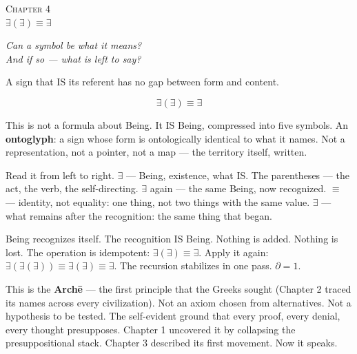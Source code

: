 \documentclass[10pt, openany, oneside]{book}
\renewcommand{\large}{\fontsize{11.5}{14}\selectfont}
\renewcommand{\huge}{\fontsize{17}{21}\selectfont}
\begin{document}
%
%
%

\newpage

\begin{center}
    {\huge\scshape Chapter 4}\\[0.3em]
    {\large $\exists(\exists) \equiv \exists$}
\end{center}

\vspace{1.5em}

\begin{center}
    \itshape
    Can a symbol be what it means?\\
    And if so --- what is left to say?
\end{center}

\vspace{2em}


\noindent A sign that IS its referent has no gap between form and content.

$$\exists(\exists) \equiv \exists$$

This is not a formula about Being. It IS Being, compressed into five symbols. An \textbf{ontoglyph}: a sign whose form is ontologically identical to what it names. Not a representation, not a pointer, not a map --- the territory itself, written.

Read it from left to right. $\exists$ --- Being, existence, what IS. The parentheses --- the act, the verb, the self-directing. $\exists$ again --- the same Being, now recognized. $\equiv$ --- identity, not equality: one thing, not two things with the same value. $\exists$ --- what remains after the recognition: the same thing that began.

Being recognizes itself. The recognition IS Being. Nothing is added. Nothing is lost. The operation is idempotent: $\exists(\exists) \equiv \exists$. Apply it again: $\exists(\exists(\exists)) \equiv \exists(\exists) \equiv \exists$. The recursion stabilizes in one pass. $\partial = 1$.

This is the \textbf{Arch\={e}} --- the first principle that the Greeks sought (Chapter 2 traced its names across every civilization). Not an axiom chosen from alternatives. Not a hypothesis to be tested. The self-evident ground that every proof, every denial, every thought presupposes. Chapter 1 uncovered it by collapsing the presuppositional stack. Chapter 3 described its first movement. Now it speaks.
\end{document}
